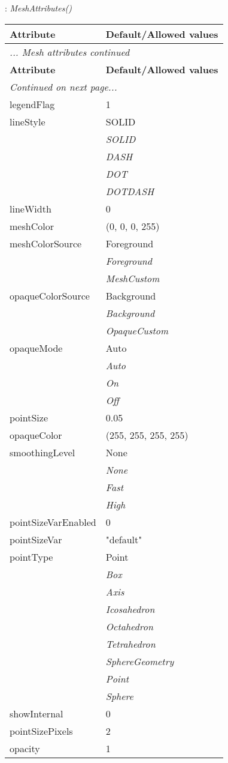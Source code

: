 \documentclass[10pt,a4paper]{report}
\begin{document}
\newpage

{}
: {\it MeshAttributes() }\\[-3mm]

\begin{longtable}{ll}
{\bf Attribute} & {\bf Default/Allowed values} \\
\hline \hline
\endfirsthead
\multicolumn{2}{l}{{\it ... Mesh attributes continued}} \\
{\bf Attribute} & {\bf Default/Allowed values} \\
\hline \hline
\endhead
\hline
\multicolumn{2}{l}{{\it Continued on next page...}} \\
\endfoot
\hline
\endlastfoot

legendFlag  &  1 \\
lineStyle  &  SOLID   \\
 & {\it  SOLID} \\
 & {\it  DASH} \\
 & {\it  DOT} \\
 & {\it  DOTDASH} \\
lineWidth  &  0 \\
meshColor  &  (0, 0, 0, 255) \\
meshColorSource  &  Foreground   \\
 & {\it  Foreground} \\
 & {\it  MeshCustom} \\
opaqueColorSource  &  Background   \\
 & {\it  Background} \\
 & {\it  OpaqueCustom} \\
opaqueMode  &  Auto   \\
 & {\it  Auto} \\
 & {\it  On} \\
 & {\it  Off} \\
pointSize  &  0.05 \\
opaqueColor  &  (255, 255, 255, 255) \\
smoothingLevel  &  None   \\
 & {\it  None} \\
 & {\it  Fast} \\
 & {\it  High} \\
pointSizeVarEnabled  &  0 \\
pointSizeVar  &  "default" \\
pointType  &  Point   \\
 & {\it  Box} \\
 & {\it  Axis} \\
 & {\it  Icosahedron} \\
 & {\it  Octahedron} \\
 & {\it  Tetrahedron} \\
 & {\it  SphereGeometry} \\
 & {\it  Point} \\
 & {\it  Sphere} \\
showInternal  &  0 \\
pointSizePixels  &  2 \\
opacity  &  1 \\
\end{longtable}
\end{document}
